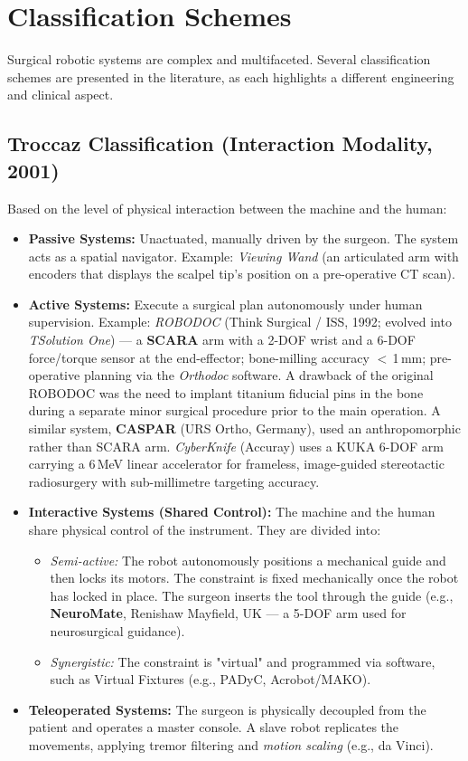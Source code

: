 \documentclass[11pt,a4paper,twoside]{report}
\begin{document}
\section{Classification Schemes}
Surgical robotic systems are complex and multifaceted. Several classification schemes are presented in the literature, as each highlights a different engineering and clinical aspect.

\subsection{Troccaz Classification (Interaction Modality, 2001)}
Based on the level of physical interaction between the machine and the human:
\begin{itemize}
    \item \textbf{Passive Systems:} Unactuated, manually driven by the surgeon. The system acts as a spatial navigator. Example: \textit{Viewing Wand} (an articulated arm with encoders that displays the scalpel tip's position on a pre-operative CT scan).
    \item \textbf{Active Systems:} Execute a surgical plan autonomously under human supervision. Example: \textit{ROBODOC} (Think Surgical / ISS, 1992; evolved into \textit{TSolution One}) — a \textbf{SCARA} arm with a 2-DOF wrist and a 6-DOF force/torque sensor at the end-effector; bone-milling accuracy $<$\,1\,mm; pre-operative planning via the \textit{Orthodoc} software. A drawback of the original ROBODOC was the need to implant titanium fiducial pins in the bone during a separate minor surgical procedure prior to the main operation. A similar system, \textbf{CASPAR} (URS Ortho, Germany), used an anthropomorphic rather than SCARA arm. \textit{CyberKnife} (Accuray) uses a KUKA 6-DOF arm carrying a 6\,MeV linear accelerator for frameless, image-guided stereotactic radiosurgery with sub-millimetre targeting accuracy.
    \item \textbf{Interactive Systems (Shared Control):} The machine and the human share physical control of the instrument. They are divided into:
    \begin{itemize}
        \item \textit{Semi-active:} The robot autonomously positions a mechanical guide and then locks its motors. The constraint is fixed mechanically once the robot has locked in place. The surgeon inserts the tool through the guide (e.g., \textbf{NeuroMate}, Renishaw Mayfield, UK — a 5-DOF arm used for neurosurgical guidance).
        \item \textit{Synergistic:} The constraint is "virtual" and programmed via software, such as Virtual Fixtures (e.g., PADyC, Acrobot/MAKO).
    \end{itemize}
    \item \textbf{Teleoperated Systems:} The surgeon is physically decoupled from the patient and operates a master console. A slave robot replicates the movements, applying tremor filtering and \textit{motion scaling} (e.g., da Vinci).
\end{itemize}
\end{document}
